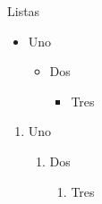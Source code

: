 \documentclass{beamer}
\begin{document}
\begin{frame}{Listas}
\begin{itemize}
\item Uno
\begin{itemize}
\item Dos
\begin{itemize}
\item Tres
\end{itemize}
\end{itemize}
\end{itemize}
\begin{enumerate}
\item Uno
\begin{enumerate}
\item Dos
\begin{enumerate}
\item Tres
\end{enumerate}
\end{enumerate}
\end{enumerate}
\end{frame}
\end{document}
